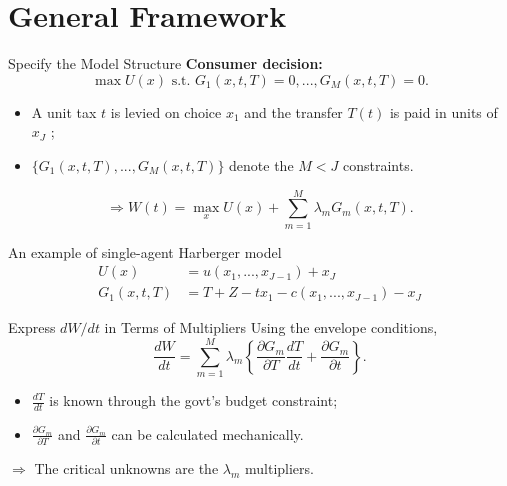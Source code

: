 \documentclass{beamer}
\begin{document}
\section{General Framework}
\begin{frame}[shrink]
	\transfade %
	\tableofcontents[sectionstyle=show/shaded,subsectionstyle=show/shaded/hide]
	\addtocounter{framenumber}{-1}
\end{frame}
\begin{frame}[label=ex_harberger]{Specify the Model Structure}
	\textbf{Consumer decision:}
	\begin{equation}
		\max U(x)\mbox{ s.t. } G_1(x,t,T) = 0,...,G_M(x,t,T) = 0.
	\end{equation}

	\begin{itemize}
		\item A unit tax $t$ is levied on choice $x_1$ and the transfer $T(t)$ is paid in units of $x_J$ ;
		\item $\{G_1(x,t,T),...,G_M(x,t,T)\}$ denote the $M<J$ constraints.
	\end{itemize}
	\begin{equation}
		\Rightarrow W(t) = \max_x U(x) + \sum_{m=1}^M\lambda_mG_m(x,t,T).
	\end{equation}
	
	\begin{block}{An example of single-agent Harberger model \hyperlink{ex_hgb_back}{}}
		\begin{equation}\nonumber
			\begin{aligned}
				U(x) &= u(x_1,...,x_{J-1}) + x_J \\
				G_1(x,t,T) &= T + Z - tx_1 - c(x_1,...,x_{J-1}) - x_J
			\end{aligned}
		\end{equation}
	\end{block}
\end{frame}
\begin{frame}{Express $dW/dt$ in Terms of Multipliers}
	Using the envelope conditions,
	\begin{equation}\label{foc_eq14}
		\frac{dW}{dt} = \sum_{m=1}^M\lambda_m\left\{\frac{\partial G_m}{\partial T}\frac{dT}{dt}+\frac{\partial G_m}{\partial t}\right\}.
	\end{equation}

	\begin{itemize}
		\item $\frac{dT}{dt}$ is known through the govt's budget constraint;
		\item $\frac{\partial G_m}{\partial T}$ and $\frac{\partial G_m}{\partial t}$ can be calculated mechanically.
	\end{itemize}
	\medskip

	$\Rightarrow$ The critical unknowns are the $\lambda_m$ multipliers.
\end{frame}
\end{document}
